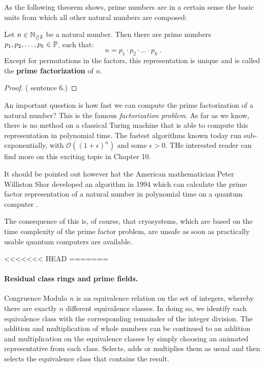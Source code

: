 As the following theorem shows, prime numbers are in a certain sense the basic units from which all other natural numbers are composed:
\begin{theorem}
\label{def: primfactor_decomposition}
Let $ n \in \mathbb{N}_{\geq 2} $ be a natural number. Then there are prime numbers 
$ p_1, p_2, \ldots, p_k \in \mathbb{P} $, such that:
\begin{equation}
n = p_1 \cdot p_2 \cdot \ldots \cdot p_k \;.
\end{equation}
Except for permutations in the factors, this representation is unique and is called the \textbf{prime factorization} of $ n $.
\end{theorem}
\begin{proof} (\cite{AL} sentence 6.) 
\end{proof}
\begin{remark}
An important question is how fast we can compute the prime factorization of a natural number? This is the famous \textit{factorization problem}. As far as we know, there is no method on a classical Turing machine that is able to compute this representation in polynomial time. The fastest algorithms known today run sub-exponentially, with $\mathcal{O}((1+ \epsilon)^n)$ and some $ \epsilon> 0 $. THe interested reader can find more on this exciting topic in \cite{JB} Chapter 10.
\end{remark}
\begin{remark}
It should be pointed out however hat the American mathematician Peter Williston Shor developed an algorithm in 1994 which can calculate the prime factor representation of a natural number in polynomial time on a quantum computer \cite{PS}.

The consequence of this is, of course, that cryosystems, which are based on the time complexity of the prime factor problem, are unsafe as soon as practically usable quantum computers are available.
\end{remark} 


<<<<<<< HEAD
=======

\paragraph{Residual class rings and prime fields.}
Congruence Modulo $ n $ is an equivalence relation on the set of integers, whereby there are exactly $ n $ different equivalence classes. In doing so, we identify each equivalence class with the corresponding remainder of the integer division. The addition and multiplication of whole numbers can be continued to an addition and multiplication on the equivalence classes by simply choosing an animated representative from each class. Selects, adds or multiplies them as usual and then selects the equivalence class that contains the result.

